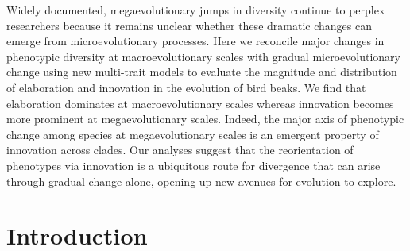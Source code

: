 \documentclass[12pt,letterpaper]{article}
\begin{document}
Widely documented, megaevolutionary jumps in diversity continue to perplex researchers because it remains unclear whether these dramatic changes can emerge from microevolutionary processes.
Here we reconcile major changes in phenotypic diversity at macroevolutionary scales with gradual microevolutionary change using new multi-trait models to evaluate the magnitude and distribution of elaboration and innovation in the evolution of bird beaks.
We find that elaboration dominates at macroevolutionary scales whereas innovation becomes more prominent at megaevolutionary scales.
Indeed, the major axis of phenotypic change among species at megaevolutionary scales is an emergent property of innovation across clades.
Our analyses suggest that the reorientation of phenotypes via innovation is a ubiquitous route for divergence that can arise through gradual change alone, opening up new avenues for evolution to explore.

\section{Introduction}

\end{document}
